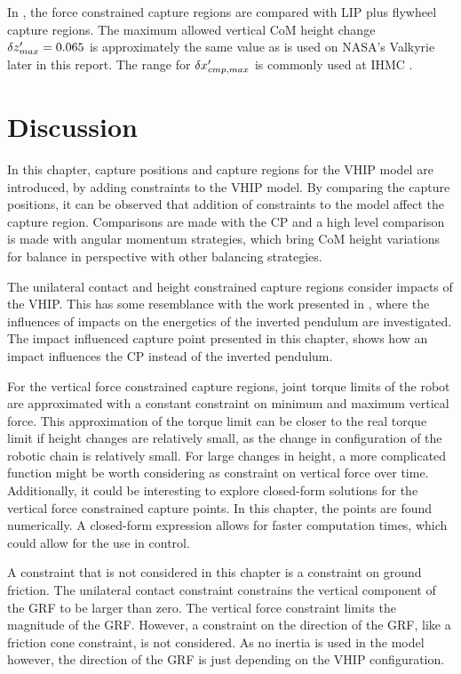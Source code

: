 In , the force constrained capture regions are compared with \ac{LIP} plus flywheel capture regions. The maximum allowed vertical \ac{CoM} height change $\delta z_{max}' =0.065$ is approximately the same value as is used on NASA's Valkyrie later in this report. The range for $\delta x_{cmp,max}'$ is commonly used at \ac{IHMC} \cite{griffin2017natural}.

\section{Discussion}
In this chapter, capture positions and capture regions for the \ac{VHIP} model are introduced, by adding constraints to the \ac{VHIP} model. By comparing the capture positions, it can be observed that addition of constraints to the model affect the capture region. Comparisons are made with the \ac{CP} and a high level comparison is made with angular momentum strategies, which bring \ac{CoM} height variations for balance in perspective with other balancing strategies.

The unilateral contact and height constrained capture regions consider impacts of the \ac{VHIP}. This has some resemblance with the work presented in \cite{kuo2005energetic}, where the influences of impacts on the energetics of the inverted pendulum are investigated. The impact influenced capture point presented in this chapter, shows how an impact influences the \ac{CP} instead of the inverted pendulum.

For the vertical force constrained capture regions, joint torque limits of the robot are approximated with a constant constraint on minimum and maximum vertical force. This approximation of the torque limit can be closer to the real torque limit if height changes are relatively small, as the change in configuration of the robotic chain is relatively small. For large changes in height, a more complicated function might be worth considering as constraint on vertical force over time. Additionally, it could be interesting to explore closed-form solutions for the vertical force constrained capture points. In this chapter, the points are found numerically. A closed-form expression allows for faster computation times, which could allow for the use in control.

A constraint that is not considered in this chapter is a constraint on ground friction. The unilateral contact constraint constrains the vertical component of the \ac{GRF} to be larger than zero. The vertical force constraint limits the magnitude of the \ac{GRF}. However, a constraint on the direction of the \ac{GRF}, like a friction cone constraint, is not considered. As no inertia is used in the model however, the direction of the \ac{GRF} is just depending on the \ac{VHIP} configuration.


